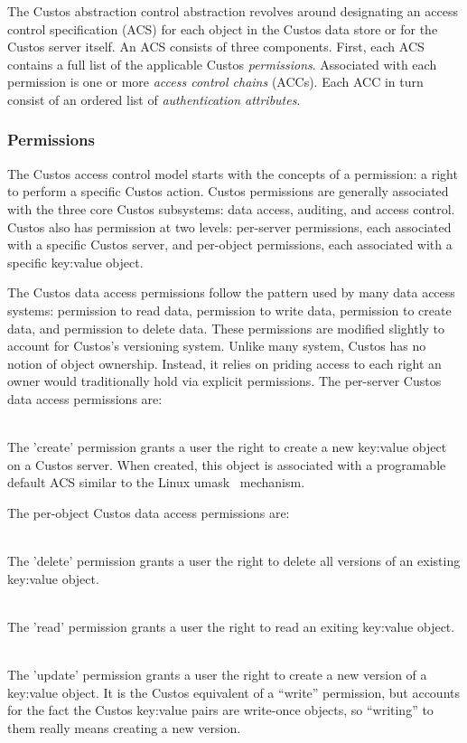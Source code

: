 The Custos abstraction control abstraction revolves around designating
an access control specification (ACS) for each object in the Custos
data store or for the Custos server itself. An ACS consists of three
components. First, each ACS contains a full list of the applicable
Custos \emph{permissions}. Associated with each permission is one or
more \emph{access control chains} (ACCs). Each ACC in turn consist of
an ordered list of \emph{authentication attributes}.

\subsubsection{Permissions}

The Custos access control model starts with the concepts of a
permission: a right to perform a specific Custos action. Custos
permissions are generally associated with the three core Custos
subsystems: data access, auditing, and access control. Custos also has
permission at two levels: per-server permissions, each associated with a
specific Custos server, and per-object permissions, each associated with
a specific key:value object.

The Custos data access permissions follow the pattern used by many
data access systems: permission to read data, permission to write
data, permission to create data, and permission to delete data. These
permissions are modified slightly to account for Custos's versioning
system. Unlike many system, Custos has no notion of object
ownership. Instead, it relies on priding access to each right an owner
would traditionally hold via explicit permissions. The per-server
Custos data access permissions are:

\begin{packed_desc}
\item[create] \hfill \\ The 'create' permission grants a user the
  right to create a new key:value object on a Custos server. When
  created, this object is associated with a programable default ACS
  similar to the Linux umask~\cite{man-umask} mechanism.
\end{packed_desc}

The per-object Custos data access permissions are:

\begin{packed_desc}
\item[delete] \hfill \\ The 'delete' permission grants a user the
  right to delete all versions of an existing key:value object.
\item[read] \hfill \\ The 'read' permission grants a user the right to
  read an exiting key:value object.
\item[update] \hfill \\ The 'update' permission grants a user the
  right to create a new version of a key:value object. It is the
  Custos equivalent of a ``write'' permission, but accounts for the fact
  the Custos key:value pairs are write-once objects, so ``writing'' to
  them really means creating a new version.
\end{packed_desc}

